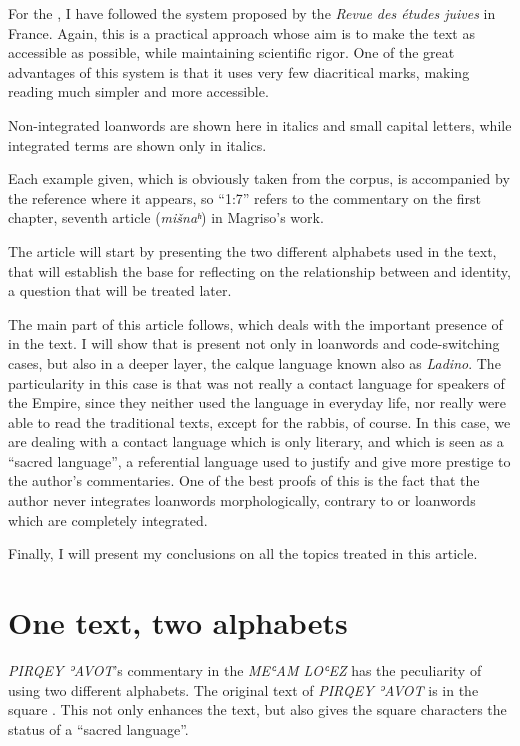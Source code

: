 \documentclass[output=paper,colorlinks,citecolor=brown,babel,arabicfont]{langscibook}
\begin{document}
For the , I have followed the system proposed by the \textit{Revue des  études juives} in France. Again, this is a practical approach whose aim is to make the text as accessible as possible, while maintaining scientific rigor. One of the great advantages of this system is that it uses very few diacritical marks, making reading much simpler and more accessible. 

Non-integrated  loanwords are shown here in italics and small capital letters, while integrated terms are shown only in italics. 

Each example given, which is obviously taken from the corpus, is accompanied by the reference where it appears, so ``1:7'' refers to the commentary on the first chapter, seventh article (\textit{mišnaʰ}) in Magriso's work. 

The article will start by presenting the two different  alphabets used in the text, that will establish the base for reflecting on the relationship between  and identity, a question that will be treated later.

The main part of this article follows, which deals with the important presence of  in the text. I will show that  is present not only in loanwords and code-switching cases, but also in a deeper layer, the calque language known also as \textit{Ladino}. The particularity in this case is that  was not really a contact language for  speakers of the  Empire, since they neither used the language in everyday life, nor really were able to read the traditional texts, except for the rabbis, of course. In this case, we are dealing with a contact language which is only literary, and which is seen as a ``sacred language'', a referential language used to justify and give more prestige to the author's commentaries. One of the best proofs of this is the fact that the author never integrates  loanwords morphologically, contrary to  or  loanwords which are completely integrated. 

Finally, I will present my conclusions on all the topics treated in this article. 

\section{One text, two alphabets}\label{ch3.7.ss.2}

\textit{PIRQEY ʾAVOT}'s commentary in the \textit{MEʿAM LOʿEZ} has the peculiarity of using two different  alphabets. The original text of \textit{PIRQEY ʾAVOT} is in the square  . This not only enhances the text, but also gives the square characters the status of a ``sacred language''.
\end{document}
